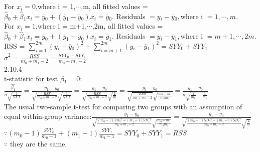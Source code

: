 \documentclass[12pt]{article}
\begin{document}
For $x{_i} = 0$,where i = 1,$\cdots$,m, all fitted values = $\hat{\beta}{_0}+\hat{\beta}{_1}x{_i} = \overline{y}{_0} + (\overline{y}{_1} - \overline{y}{_0})x{_i} = \overline{y}{_0}.$ Residuals $= y{_i} - \overline{y}{_0},$where i $= 1,\cdots,m. $ \\

For $x{_i} = 1$,where i = m+1,$\cdots$,2m, all fitted values = $\hat{\beta}{_0}+\hat{\beta}{_1}x{_i} = \overline{y}{_0} + (\overline{y}{_1} - \overline{y}{_0})x{_i} = \overline{y}{_1}$. Residuals $= y{_i} - \overline{y}{_1},$where i $= m+1,\cdots,2m. $\\

RSS = $\sum_{i=1}^{2m} (y{_i} - \overline{y}{_0})^2 + \sum_{i=m+1}^{2m} (y{_i} - \overline{y}{_1})^2 = SYY{_0} + SYY{_1}$\\

$\hat{\sigma}^2 = \frac{RSS}{m{_0}+m{_1}-2} = \frac{SYY{_0} + SYY{_1}}{m{_0}+m{_1}-2}$\\

2.10.4\\

t-statistic for test $\beta{_1}=0$: $\frac{\hat{\beta{_1}}}{\sigma\sqrt{\frac{1}{SXX}}} = \frac{\overline{y}{_1} - \overline{y}{_0}}{\sqrt{\frac{RSS}{m{_0}+m{_1}-2}}\sqrt{\frac{1}{SXX}}} = \frac{\overline{y}{_1} - \overline{y}{_0}}{\sqrt{\frac{RSS}{m{_0}+m{_1}-2}}\sqrt{\frac{2}{m}}} =\frac{\overline{y}{_1} - \overline{y}{_0}}{\sqrt{\frac{RSS}{m{_0}+m{_1}-2}}\sqrt{\frac{m{_0}+m{_1}}{m{_0}m{_1}}}} = \frac{\overline{y}{_1} - \overline{y}{_0}}{\hat{\sigma}\sqrt{ \frac{1}{m{_0}}+\frac{1}{m{_1}}} }$\\

The usual two-sample t-test for comparing two groups with an assumption of equal within-group variance:$\frac{\overline{y}{_1} - \overline{y}{_0}}{\sqrt{\frac{(m{_0}-1)SD{_0}^2 + (m{_1}-1)SD{_1}^2}{m{_0}+m{_1}-2}}\sqrt{\frac{m{_0}+m{_1}}{m{_0}m{_1}}}} = \frac{\overline{y}{_1} - \overline{y}{_0}}{\sqrt{\frac{(m{_0}-1)SD{_0}^2 + (m{_1}-1)SD{_1}^2}{m{_0}+m{_1}-2}}\sqrt{\frac{2}{m}}}$\\

$\because (m{_0}-1){\frac{SYY{_0}}{m{_0}-1}} + (m{_1}-1){\frac{SYY{_1}}{m{_1}-1}} = SYY{_0} + SYY{_1} = RSS$\\

$\because$ they are the same.
\end{document}
